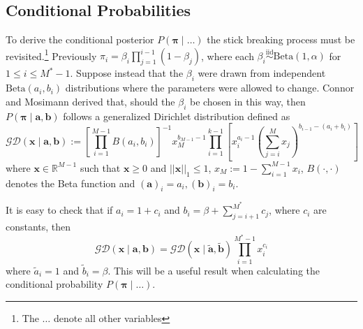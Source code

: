 \documentclass[10pt,a4paper,notitlepage]{article}
\newcommand{\abs}[1]{\lvert#1\rvert}
\newcommand{\R}{\mathbb{R}}
\newcommand{\x}{\textbf{x}}
\newcommand{\iid}{\stackrel{\text{iid}}{\sim}}
\begin{document}
\subsection{Conditional Probabilities}\label{sc:4.2}
To derive the conditional posterior $P(\bm{\pi}\mid \hdots)$ the stick breaking process must be revisited.\footnote{The $\hdots$ denote all other variables} Previously $\pi_{i}=\beta_{i}\prod_{j=1}^{i-1}(1-\beta_{j})$, where each $\beta_{i}\iid \text{Beta}(1,\alpha)$ for $1\leq i\leq M^{*}-1$. Suppose instead that the $\beta_{i}$ were drawn from independent $\text{Beta}(a_{i},b_{i})$ distributions where the parameters were allowed to change. Connor and Mosimann \cite{Connor} derived that, should the $\beta_{i}$ be chosen in this way, then $P(\bm{\pi}\mid \mathbf{a},\mathbf{b})$ follows a generalized Dirichlet distribution defined as
\begin{equation}
\mathcal{GD}(\x\mid\mathbf{a},\mathbf{b}):= \left[\prod_{i=1}^{M-1}B(a_{i},b_{i})\right]^{-1}x_{M}^{b_{M-1}-1}\prod_{i=1}^{k-1}\left[ x_{i}^{a_{i}-1}\left(\sum_{j=i}^{M}x_{j}\right)^{b_{i-1}-(a_{i}+b_{i})}\right]
\end{equation}
where $\x\in \R^{M-1}$ such that $\x\geq 0$ and $\abs{\abs{\x}}_{1}\leq 1$, $x_{M}:=1-\sum_{i=1}^{M-1}x_{i}$, $B(\cdot,\cdot)$ denotes the Beta function and $(\mathbf{a})_{i}=a_{i}, (\mathbf{b})_{i}=b_{i}$.

It is easy to check that if $a_{i}=1+c_{i}$ and $b_{i}=\beta +\sum_{j=i+1}^{M^{*}}c_{j}$, where $c_{i}$ are constants, then
\begin{equation}\label{eq:GD}
\mathcal{GD}(\x\mid\mathbf{a},\mathbf{b})=\mathcal{GD}(\x\mid \mathbf{\tilde{a}},\mathbf{\tilde{b}})\prod_{i=1}^{M^{*}-1}x_{i}^{c_{i}}
\end{equation} 
where $\tilde{a}_{i}=1$ and $\tilde{b}_{i}=\beta$. This will be a useful result when calculating the conditional probability $P(\bm{\pi}\mid\hdots)$.\\
\end{document}
